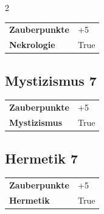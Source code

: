 \begin{multicols}{2}
\begin{tcolorbox}
\begin{tabular}{@{}ll@{}}
    \textbf{Zauberpunkte} & +5\\
    \textbf{Nekrologie} & True\\
\end{tabular}


\end{tcolorbox}

\begin{tcolorbox}
    \subsection*{Mystizismus \hfill \small{7 }}
    \tcblower




\begin{tabular}{@{}ll@{}}
    \textbf{Zauberpunkte} & +5\\
    \textbf{Mystizismus} & True\\
\end{tabular}


\end{tcolorbox}

\begin{tcolorbox}
    \subsection*{Hermetik \hfill \small{7 }}
    \tcblower




\begin{tabular}{@{}ll@{}}
    \textbf{Zauberpunkte} & +5\\
    \textbf{Hermetik} & True\\
\end{tabular}


\end{tcolorbox}

\begin{tcolorbox}

\end{tcolorbox}
\end{multicols}
